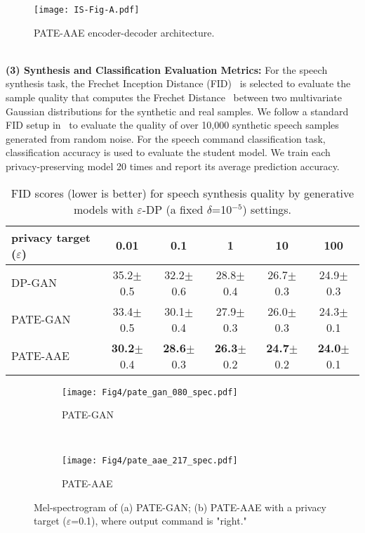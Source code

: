 \documentclass[a4paper]{article}
\begin{document}
\begin{figure}[ht!]
    \centering
    \texttt{[image: IS-Fig-A.pdf]}
    \caption{PATE-AAE encoder-decoder architecture. }
    \label{fig:a}
\end{figure}
\\
\textbf{(3) Synthesis and Classification Evaluation Metrics:}
For the speech synthesis task, the Frechet Inception Distance (FID)~\cite{shmelkov2018good} is selected to evaluate the sample quality that computes the Frechet Distance~\cite{dowson1982frechet} between two multivariate Gaussian distributions for the synthetic and real samples. We follow a standard FID setup in~\cite{haque2020high} to evaluate the quality of over 10,000 synthetic speech samples generated from random noise. For the speech command classification task, classification accuracy is used to evaluate the student model. We train each privacy-preserving model 20 times and report its average prediction accuracy.




\begin{table}[ht!]
\centering
\caption{FID scores (lower is better) for speech synthesis quality by generative models with $\varepsilon$-DP (a fixed $\delta$=10$^{-5}$) settings.}
\label{tab:1:fid}
\begin{adjustbox}{width=0.47\textwidth}
\begin{tabular}{|l|ccccc|}
\hline
privacy target ($\varepsilon$) & 0.01 & 0.1  & 1    & 10 & 100   \\ \hline \hline
DP-GAN~\cite{xie2018differentially}         & 35.2$\pm$0.5 & 32.2$\pm$0.6 & 28.8$\pm$0.4 & 26.7$\pm$0.3 & 24.9$\pm$0.3 \\ \hline
PATE-GAN~\cite{jordon2019pate}       & 33.4$\pm$0.5 & 30.1$\pm$0.4 & 27.9$\pm$0.3 & 26.0$\pm$0.3  & 24.3$\pm$0.1 \\ \hline
PATE-AAE       & \textbf{30.2}$\pm$0.4 & \textbf{28.6}$\pm$0.3 & \textbf{26.3}$\pm$0.2 & \textbf{24.7}$\pm$0.2& \textbf{24.0}$\pm$0.1 \\ \hline
\end{tabular}
\end{adjustbox}
\end{table}


\begin{figure}[ht!]
        \centering
        \begin{subfigure}[b]{0.213\textwidth}
            \centering
            \texttt{[image: Fig4/pate\_gan\_080\_spec.pdf]}
            \caption[]{{\small PATE-GAN}}
            \label{fig:pateg:s}
        \end{subfigure}
        \quad~~~~
        \begin{subfigure}[b]{0.213\textwidth}
            \centering
            \texttt{[image: Fig4/pate\_aae\_217\_spec.pdf]}
            \caption[]{{\small PATE-AAE}}
            \label{fig:mean and std of net44}
        \end{subfigure}
        \caption[  ]
        {\small Mel-spectrogram of (a) PATE-GAN; (b) PATE-AAE with a privacy target ($\varepsilon$=0.1), where output command is "right."}
        \label{fig:3}
    \end{figure}
\end{document}
